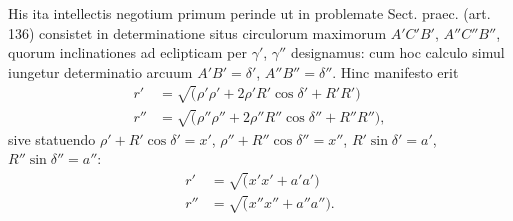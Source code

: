 \par
His ita intellectis negotium primum perinde ut in problemate Sect. praec.
(art. 136) consistet in determinatione situs circulorum maximorum $A'C'B'$,
$A''C''B''$, quorum inclinationes ad eclipticam per $\gamma'$, $\gamma''$ designamus: cum hoc
calculo simul iungetur determinatio arcuum $A'B'=\delta'$, $A''B''=\delta''$. Hinc
manifesto erit
\[
\begin{aligned}
r'&=\surd(\rho'\rho'+2\rho'R'\cos\delta'+R'R')\\
r''&=\surd(\rho''\rho''+2\rho''R''\cos\delta''+R''R''),
\end{aligned}
\]
\noindent sive statuendo $\rho'+R'\cos\delta'=x'$, $\rho''+R''\cos\delta''=x''$,
$R'\sin\delta'=a'$, $R''\sin\delta''=a''$:
\[
\begin{aligned}
r'&=\surd(x'x'+a'a')\\
r''&=\surd(x''x''+a''a'').
\end{aligned}
\]
